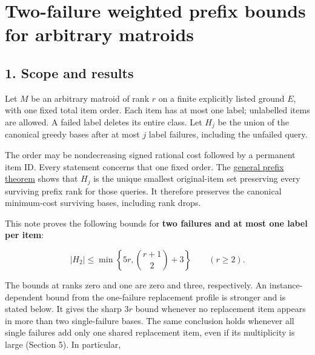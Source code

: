 
\hypertarget{af-0a3ce40617-two-failure-weighted-prefix-bounds-for-arbitrary-matroids}{%
\section{Two-failure weighted prefix bounds for arbitrary matroids}\label{af-0a3ce40617-two-failure-weighted-prefix-bounds-for-arbitrary-matroids}}

\hypertarget{af-0a3ce40617-scope-and-results}{%
\subsection{1. Scope and results}\label{af-0a3ce40617-scope-and-results}}

Let \(M\) be an arbitrary matroid of rank \(r\) on a finite explicitly listed ground \(E\), with one fixed total item order. Each item has at most one label; unlabelled items are allowed. A failed label deletes its entire class. Let \(H_j\) be the union of the canonical greedy bases after at most \(j\) label failures, including the unfailed query.

The order may be nondecreasing signed rational cost followed by a permanent item ID. Every statement concerns that one fixed order. The \href{https://github.com/icekylinx/algorithm-frontier/blob/main/problems/matroid-failure-summaries/manuscripts/weighted-oracle-prefix-fpt-construction.md}{general prefix theorem} shows that \(H_j\) is the unique smallest original-item set preserving every surviving prefix rank for those queries. It therefore preserves the canonical minimum-cost surviving bases, including rank drops.

This note proves the following bounds for \textbf{two failures and at most one label per item}:

\[
|H_2|\le\min\left\{5r,\binom{r+1}{2}+3\right\}
\qquad(r\ge2).
\tag{TF1}
\]

The bounds at ranks zero and one are zero and three, respectively. An instance-dependent bound from the one-failure replacement profile is stronger and is stated below. It gives the sharp \(3r\) bound whenever no replacement item appears in more than two single-failure bases. The same conclusion holds whenever all single failures add only one shared replacement item, even if its multiplicity is large (Section 5). In particular,

